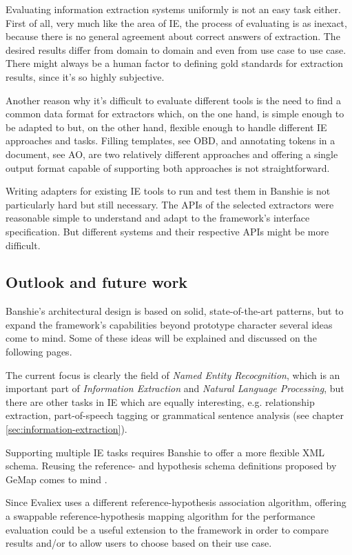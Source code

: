 Evaluating information extraction systems uniformly is not an easy task either. First of all, very much like the area of \gls{IE}, the process of evaluating is as inexact, because there is no general agreement about correct answers of extraction. The desired results differ from domain to domain and even from use case to use case. There might always be a human factor to defining gold standards for extraction results, since it's so highly subjective.

Another reason why it's difficult to evaluate different tools is the need to find a common data format for extractors which, on the one hand, is simple enough to be adapted to but, on the other hand, flexible enough to handle different \gls{IE} approaches and tasks. Filling templates, see \acl{OBD}, and annotating tokens in a document, see \acl{AO}, are two relatively different approaches and offering a single output format capable of supporting both approaches is not straightforward.

Writing adapters for existing \gls{IE} tools to run and test them in Banshie is not particularly hard but still necessary. The APIs of the selected extractors were reasonable simple to understand and adapt to the framework's interface specification. But different systems and their respective APIs might be more difficult.

\subsection{Outlook and future work}
Banshie's architectural design is based on solid, state-of-the-art patterns, but to expand the framework's capabilities beyond prototype character several ideas come to mind. Some of these ideas will be explained and discussed on the following pages.

The current focus is clearly the field of \textit{Named Entity Recocgnition}, which is an important part of \textit{Information Extraction} and \textit{Natural Language Processing}, but there are other tasks in \gls{IE} which are equally interesting, e.g. relationship extraction, part-of-speech tagging or grammatical sentence analysis (see chapter \ref{sec:information-extraction}).

Supporting multiple \gls{IE} tasks requires Banshie to offer a more flexible XML schema. Reusing the reference- and hypothesis schema definitions proposed by GeMap comes to mind \cite{Linsmayr:2010b}.

Since Evaliex uses a different reference-hypothesis association algorithm, offering a swappable reference-hypothesis mapping algorithm for the performance evaluation could be a useful extension to the framework in order to compare results and/or to allow users to choose based on their use case.

